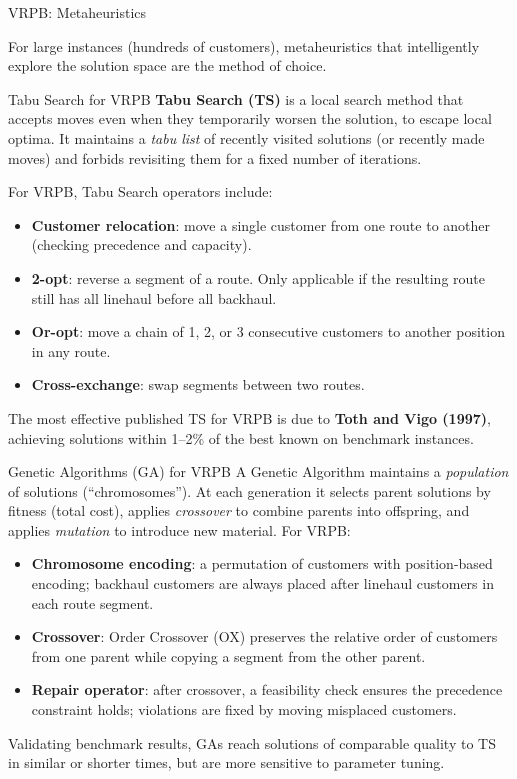 \documentclass[aspectratio=169,10pt]{beamer}
\begin{document}
\begin{frame}[allowframebreaks]{VRPB: Metaheuristics}

For large instances (hundreds of customers), metaheuristics that intelligently
explore the solution space are the method of choice.

\begin{block}{Tabu Search for VRPB}
  \textbf{Tabu Search (TS)} is a local search method that accepts moves even
  when they temporarily worsen the solution, to escape local optima.  It
  maintains a \emph{tabu list} of recently visited solutions (or recently made
  moves) and forbids revisiting them for a fixed number of iterations.

  \medskip
  For VRPB, Tabu Search operators include:
  \begin{itemize}
    \item \textbf{Customer relocation}: move a single customer from one route
          to another (checking precedence and capacity).
    \item \textbf{2-opt}: reverse a segment of a route.  Only applicable if
          the resulting route still has all linehaul before all backhaul.
    \item \textbf{Or-opt}: move a chain of 1, 2, or 3 consecutive customers
          to another position in any route.
    \item \textbf{Cross-exchange}: swap segments between two routes.
  \end{itemize}
  The most effective published TS for VRPB is due to \textbf{Toth and Vigo
  (1997)}, achieving solutions within 1--2\% of the best known on benchmark
  instances.
\end{block}

\framebreak

\begin{block}{Genetic Algorithms (GA) for VRPB}
  A Genetic Algorithm maintains a \emph{population} of solutions (``chromosomes'').
  At each generation it selects parent solutions by fitness (total cost),
  applies \emph{crossover} to combine parents into offspring, and applies
  \emph{mutation} to introduce new material.  For VRPB:
  \begin{itemize}
    \item \textbf{Chromosome encoding}: a permutation of customers with
          position-based encoding; backhaul customers are always placed after
          linehaul customers in each route segment.
    \item \textbf{Crossover}: Order Crossover (OX) preserves the relative
          order of customers from one parent while copying a segment from the
          other parent.
    \item \textbf{Repair operator}: after crossover, a feasibility check
          ensures the precedence constraint holds; violations are fixed by
          moving misplaced customers.
  \end{itemize}
  Validating benchmark results, GAs reach solutions of comparable quality to
  TS in similar or shorter times, but are more sensitive to parameter tuning.
\end{block}


\end{frame}
\end{document}
